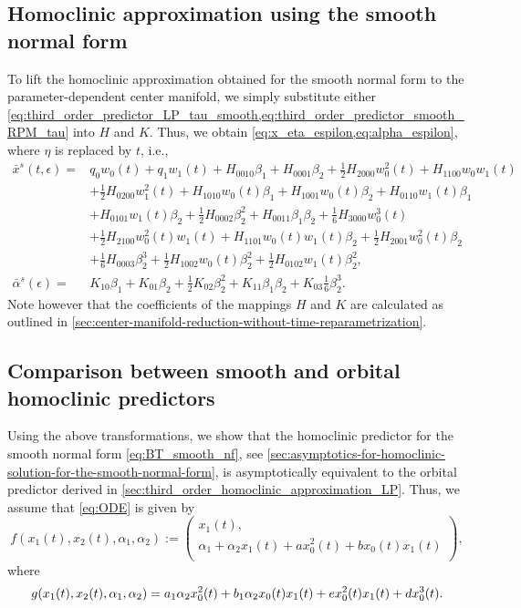 \subsection{Homoclinic approximation using the smooth normal form}
To lift the homoclinic approximation obtained for the smooth normal form to the
parameter-dependent center manifold, we simply substitute either
\cref{eq:third_order_predictor_LP_tau_smooth,eq:third_order_predictor_smooth_RPM_tau}
into $H$ and $K$. Thus, we obtain \cref{eq:x_eta_espilon,eq:alpha_espilon}, where
$\eta$ is replaced by $t$, i.e., 
\begin{align*}
\bar x^s(t, \epsilon)={}& q_0w_0(t) + q_1w_1(t) + H_{0010}\beta_1 + H_{0001} \beta_2 
+ \frac12 H_{2000}w_0^2(t) + H_{1100}w_0w_1(t) \\
                         & + \frac12 H_{0200}w_1^2(t) + H_{1010}w_0(t)\beta_1 + H_{1001}w_0(t)\beta_2 + H_{0110}w_1(t)\beta_1 \nonumber \\
                         & + H_{0101}w_1(t)\beta_2 + \frac12 H_{0002}\beta_2^2+ H_{0011}\beta_1\beta_2 + \frac16 H_{3000}w_0^3(t) \nonumber \\
                         & + \frac12 H_{2100}w_0^2(t)w_1(t) + H_{1101}w_0(t)w_1(t)\beta_2 + \frac12 H_{2001}w_0^2(t)\beta_2 \nonumber \\
                         & + \frac{1}{6}H_{0003}\beta_2^3 + \frac12 H_{1002}w_0(t)\beta_2^2 + \frac12 H_{0102}w_1(t)\beta_2^2, \nonumber \\
\bar \alpha^s(\epsilon) ={}& K_{10}\beta_1 + K_{01}\beta_2 + \frac{1}{2}K_{02}\beta_2^{2} + K_{11}\beta_1\beta_2 + K_{03} \frac16 \beta_2^3.
\end{align*}
Note however that the coefficients of the mappings $H$ and $K$ are calculated
as outlined in
\cref{sec:center-manifold-reduction-without-time-reparametrization}.

\subsection{Comparison between smooth and orbital homoclinic predictors}
\label{sec:comparison_homoclinic_predictors}
Using the above transformations, we show that the homoclinic predictor for the
smooth normal form \cref{eq:BT_smooth_nf}, see
\cref{sec:asymptotics-for-homoclinic-solution-for-the-smooth-normal-form}, is
asymptotically equivalent to the orbital predictor derived in
\cref{sec:third_order_homoclinic_approximation_LP}. Thus, we assume that
\cref{eq:ODE} is given by 
\begin{equation}
    \label{eq:compare:f_normal_form} 
    f(x_1(t), x_2(t), \alpha_1, \alpha_2) := \left(\begin{array}{l}
            x_1(t),\\
            \alpha_1 + \alpha_2 x_1(t) + ax_0^2(t) + b x_0(t)x_1(t) \\
    \end{array}\right),
\end{equation}
where
\begin{equation*}
    g(x_1(t), x_2(t), \alpha_1, \alpha_2) =  a_1\alpha_2 x_0^2(t) + 
    b_1\alpha_2 x_0(t) x_1(t) + ex_0^{2}(t)x_1(t) + dx_0^3(t). \\
\end{equation*}

